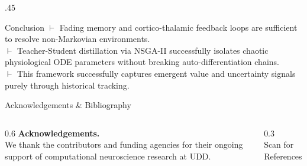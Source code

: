 \documentclass[final]{beamer}
\begin{document}
\begin{frame}[fragile,t]
\begin{columns}[T]
\begin{column}{.45\textwidth}
      \begin{block}{Conclusion}
        $\vdash$ Fading memory and cortico-thalamic feedback loops are sufficient to resolve non-Markovian environments. \\
        \vspace{0.2em}
        $\vdash$ Teacher-Student distillation via NSGA-II successfully isolates chaotic physiological ODE parameters without breaking auto-differentiation chains. \\
        \vspace{0.2em}
        $\vdash$ This framework successfully captures emergent value and uncertainty signals purely through historical tracking.
      \end{block}
      
      \begin{block}{Acknowledgements \& Bibliography}
        \begin{columns}[T]
          \begin{column}{0.6\textwidth}
            \textbf{Acknowledgements.}\\
            We thank the contributors and funding agencies for their ongoing support of computational neuroscience research at UDD.
          \end{column}
          \begin{column}{0.3\textwidth}
            \centering
             \\
            \vspace{1ex}
            \normalsize Scan for References
          \end{column}
        \end{columns}
      \end{block}

    \end{column}
  \end{columns}
\end{frame}
\end{document}
